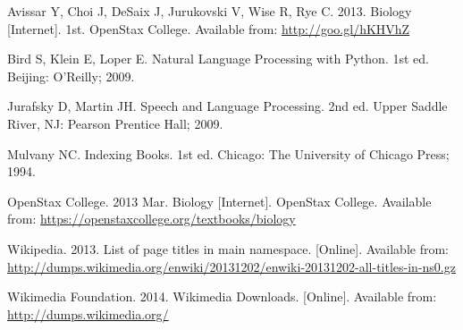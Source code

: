 \begin{thebibliography}{99}
  Avissar Y, Choi J, DeSaix J, Jurukovski V, Wise R, Rye C. 2013. Biology [Internet]. 1st. OpenStax College. Available from: \url{http://goo.gl/hKHVhZ}

Bird S, Klein E, Loper E. Natural Language Processing with Python. 1st ed. Beijing: O’Reilly; 2009.

Jurafsky D, Martin JH. Speech and Language Processing. 2nd ed. Upper Saddle River, NJ: Pearson Prentice Hall; 2009.

Mulvany NC. Indexing Books. 1st ed. Chicago: The University of Chicago Press; 1994.

OpenStax College. 2013 Mar. Biology [Internet]. OpenStax College. Available from: \url{https://openstaxcollege.org/textbooks/biology}

Wikipedia. 2013. List of page titles in main namespace. [Online]. Available from: \url{http://dumps.wikimedia.org/enwiki/20131202/enwiki-20131202-all-titles-in-ns0.gz}

Wikimedia Foundation. 2014. Wikimedia Downloads. [Online]. Available from: \url{http://dumps.wikimedia.org/}

\end{thebibliography}